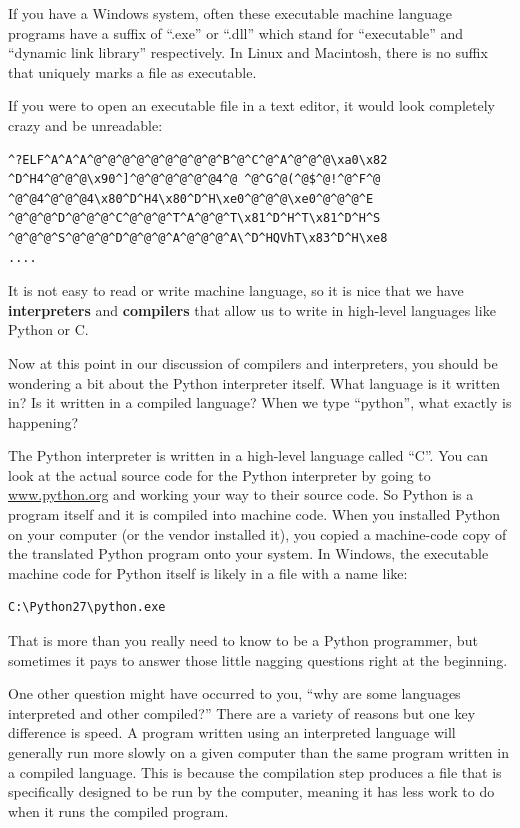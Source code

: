 If you have a Windows system, often these executable machine language programs have a
suffix of ``.exe'' or ``.dll'' which stand for ``executable'' and ``dynamic link
library'' respectively.  In Linux and Macintosh, there is no suffix that uniquely marks
a file as executable.

If you were to open an executable file in a text editor, it would look 
completely crazy and be unreadable:

\beforeverb
\begin{verbatim}
^?ELF^A^A^A^@^@^@^@^@^@^@^@^@^B^@^C^@^A^@^@^@\xa0\x82
^D^H4^@^@^@\x90^]^@^@^@^@^@^@4^@ ^@^G^@(^@$^@!^@^F^@
^@^@4^@^@^@4\x80^D^H4\x80^D^H\xe0^@^@^@\xe0^@^@^@^E
^@^@^@^D^@^@^@^C^@^@^@^T^A^@^@^T\x81^D^H^T\x81^D^H^S
^@^@^@^S^@^@^@^D^@^@^@^A^@^@^@^A\^D^HQVhT\x83^D^H\xe8
....
\end{verbatim}
\afterverb
%
It is not easy to read or write machine language, so it is nice that we have
{\bf interpreters} and {\bf compilers} that allow us to write in high-level
languages like Python or C.

Now at this point in our discussion of compilers and interpreters, you should 
be wondering a bit about the Python interpreter itself.  What language is 
it written in?  Is it written in a compiled language?  When we type
``python'', what exactly is happening?

The Python interpreter is written in a high-level language called ``C''.  
You can look at the actual source code for the Python interpreter by
going to \url{www.python.org} and working your way to their source code.
So Python is a program itself and it is compiled into machine code.
When you installed Python on your computer (or the vendor installed it),
you copied a machine-code copy of the translated Python program onto your
system.   In Windows, the executable machine code for Python itself is likely
in a file with a name like:

\beforeverb
\begin{verbatim}
C:\Python27\python.exe
\end{verbatim}
\afterverb
%
That is more than you really need to know to be a Python programmer, but
sometimes it pays to answer those little nagging questions right at 
the beginning.

One other question might have occurred to you, ``why are some languages interpreted and other compiled?'' There are a variety of reasons but one key difference is speed. A program written using an interpreted language will generally run more slowly on a given computer than the same program written in a compiled language. This is because the compilation step produces a file that is specifically designed to be run by the computer, meaning it has less work to do when it runs the compiled program.

